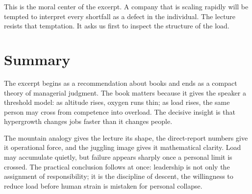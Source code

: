 This is the moral center of the excerpt. A company that is scaling rapidly will be tempted to interpret every shortfall as a defect in the individual. The lecture resists that temptation. It asks us first to inspect the structure of the load.

\section{Summary}

The excerpt begins as a recommendation about books and ends as a compact theory of managerial judgment. The book matters because it gives the speaker a threshold model: as altitude rises, oxygen runs thin; as load rises, the same person may cross from competence into overload. The decisive insight is that hypergrowth changes jobs faster than it changes people.

The mountain analogy gives the lecture its shape, the direct-report numbers give it operational force, and the juggling image gives it mathematical clarity. Load may accumulate quietly, but failure appears sharply once a personal limit is crossed. The practical conclusion follows at once: leadership is not only the assignment of responsibility; it is the discipline of descent, the willingness to reduce load before human strain is mistaken for personal collapse.